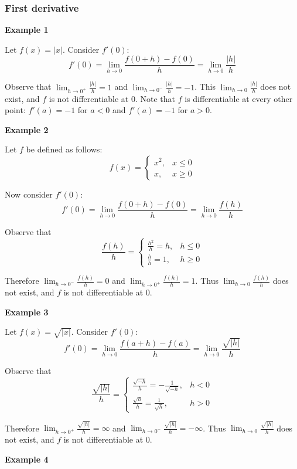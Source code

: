\subsubsection*{First derivative}

\textbf{Example 1}

Let $f(x)=|x|$. Consider $f'(0)$:
\[f'(0)=\lim_{h\to0}\frac{f(0+h)-f(0)}{h}=\lim_{h\to0}\frac{|h|}{h}\]

Observe that $\lim_{h\to0^+}\frac{|h|}{h}=1$ and
$\lim_{h\to0^-}\frac{|h|}{h}=-1$. This $\lim_{h\to0}\frac{|h|}{h}$ does
not exist, and $f$ is not differentiable at $0$. Note that $f$ is
differentiable at every other point: $f'(a)=-1$ for $a<0$ and
$f'(a)=-1$ for $a>0$.

\vs

\textbf{Example 2}

Let $f$ be defined as follows:
\[f(x)=\begin{cases}
  x^2,&x\leq 0\\
  x,&x\geq 0
\end{cases}\]

Now consider $f'(0)$:
\[f'(0)=\lim_{h\to0}\frac{f(0+h)-f(0)}{h}=\lim_{h\to0}\frac{f(h)}{h}\]

Observe that
\[\frac{f(h)}{h}=\begin{cases}
  \frac{h^2}{h}=h,&h\leq0\\
  \frac{h}{h}=1,&h\geq0
\end{cases}\]

Therefore $\lim_{h\to0^-}\frac{f(h)}{h}=0$ and
$\lim_{h\to0^+}\frac{f(h)}{h}=1$. Thus $\lim_{h\to0}\frac{f(h)}{h}$ does
not exist, and $f$ is not differentiable at $0$.

\vs

\textbf{Example 3}

Let $f(x)=\sqrt{|x|}$. Consider $f'(0)$:
\[f'(0)=\lim_{h\to0}\frac{f(a+h)-f(a)}{h}=\lim_{h\to0}\frac{\sqrt{|h|}}{h}\]

Observe that
\[\frac{\sqrt{|h|}}{h}=\begin{cases}
  \frac{\sqrt{-h}}{h}=-\frac{1}{\sqrt{-h}},&h<0\\
  \frac{\sqrt{h}}{h}=\frac{1}{\sqrt{h}},&h>0
\end{cases}\]

Therefore $\lim_{h\to0^+}\frac{\sqrt{|h|}}{h}=\infty$ and
$\lim_{h\to0^-}\frac{\sqrt{|h|}}{h}=-\infty$. Thus
$\lim_{h\to0}\frac{\sqrt{|h|}}{h}$ does not exist, and $f$ is not
differentiable at $0$.

\vs

\textbf{Example 4}

